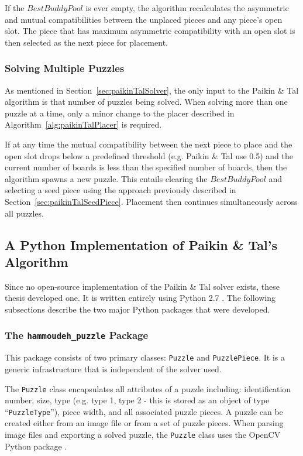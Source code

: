 \documentclass{report}
\newcommand{\hammoudehPuzzlePackage}{\texttt{hammoudeh\_puzzle} }
\begin{document}
If the $BestBuddyPool$ is ever empty, the algorithm recalculates the asymmetric and mutual compatibilities between the unplaced pieces and any piece's open slot.  The piece that has maximum asymmetric compatibility with an open slot is then selected as the next piece for placement.

\subsubsection{Solving Multiple Puzzles}\label{sec:paikinTalSolvingMultiplePuzzles}

As mentioned in Section~\ref{sec:paikinTalSolver}, the only input to the Paikin \& Tal algorithm is that number of puzzles being solved.   When solving more than one puzzle at a time, only a minor change to the placer described in Algorithm~\ref{alg:paikinTalPlacer} is required.

If at any time the mutual compatibility between the next piece to place and the open slot drops below a predefined threshold (e.g. Paikin \& Tal use 0.5) and the current number of boards is less than the specified number of boards, then the algorithm spawns a new puzzle.  This entails clearing the $BestBuddyPool$ and selecting a seed piece using the approach previously described in Section~\ref{sec:paikinTalSeedPiece}.   Placement then continues simultaneously across all puzzles.


\subsection{A Python Implementation of Paikin \& Tal's Algorithm}\label{sec:pythonPaikinTalAlgorithm}

Since no open-source implementation of the Paikin \& Tal solver exists, these thesis developed one.  It is written entirely using Python 2.7 \cite{python}.  The following subsections describe the two major Python packages that were developed.  

\subsubsection{The \hammoudehPuzzlePackage Package}\label{sec:hammoudehPuzzlePackage}

This package consists of two primary classes: \texttt{Puzzle} and \texttt{PuzzlePiece}.  It is a generic infrastructure that is independent of the solver used.  

The \texttt{Puzzle} class encapsulates all attributes of a puzzle including: identification number, size, type (e.g. type 1, type 2 - this is stored as an object of type ``\texttt{PuzzleType}''), piece width, and all associated puzzle pieces.  A puzzle can be created either from an image file or from a set of puzzle pieces.   When parsing image files and exporting a solved puzzle, the \texttt{Puzzle} class uses the OpenCV Python package \cite{opencv_library}. 
\end{document}

